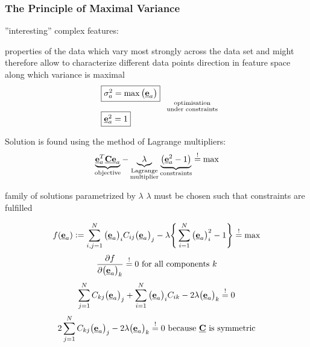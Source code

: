 \subsubsection{The Principle of Maximal Variance}
''interesting'' complex features:
\begin{itemize}
	\itR properties of the data which vary most strongly across the data set and might therefore allow to characterize different data points
	\itR direction in feature space along which variance is maximal
		\[ \left. \begin{array}{ll}
			\fbox{$ \sigma_a^2 = \max \big( \vec{e}_a \big) $} \\\\
			\fbox{$ \vec{e}_a^2 = 1 $}
		\end{array} \right. 
		\substack{ 	\text{optimisation} \\
				\text{under constraints} } \]
\end{itemize}
Solution is found using the method of Lagrange multipliers:
\begin{equation}
	\underbrace{ \vec{e}_a^T \vec{C} \vec{e}_a }_{
		\text{objective} }
	- \underbrace{ \lambda }_{ \substack{ 	\text{Lagrange} \\
						\text{multiplier}} }
		\underbrace{ \big( \vec{e}_a^2 - 1 \big) }_{
			\text{constraints} }
	\eqexcl \max
\end{equation}
\begin{itemize}
	\itl family of solutions parametrized by $\lambda$
	\itl $\lambda$ must be chosen such that constraints are fulfilled
\end{itemize}
\begin{equation}
	f(\vec{e}_a) := \sum\limits_{i,j = 1}^N \big( \vec{e}_a \big)_i C_{ij} \big( \vec{e}_a
		\big)_j - \lambda \Bigg\{ \sum\limits_{i = 1}^N \big(
		\vec{e}_a \big)_i^2 - 1 \Bigg\} \eqexcl \max
\end{equation}
\begin{equation}
	\frac{\partial f}{\partial \big( \vec{e}_a \big)_k} \eqexcl 0
	\text{ for all components }k
\end{equation}
\begin{equation}
	\sum\limits_{j = 1}^N C_{kj} \big( \vec{e}_a \big)_j 
		+ \sum\limits_{i = 1}^N \big( \vec{e}_a \big)_i C_{ik}
		- 2 \lambda \big( \vec{e}_a \big)_k \eqexcl 0
\end{equation}
\begin{equation}
	2 \sum\limits_{j = 1}^N C_{kj} \big( \vec{e}_a \big)_j - 2 \lambda
		\big( \vec{e}_a \big)_k \eqexcl 0
		\text{ because } \vec{C} \text{ is symmetric}
\end{equation}
